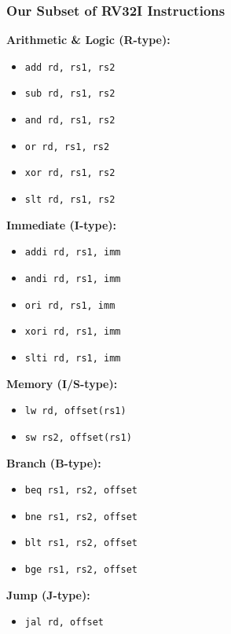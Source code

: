 \documentclass[aspectratio=169,xcolor=dvipsnames]{beamer}
\begin{document}
\begin{frame}
\frametitle{Our Subset of RV32I Instructions}
\begin{multicols}{2}
\textbf{Arithmetic \& Logic (R-type):}
\begin{itemize}
    \item \texttt{add rd, rs1, rs2}
    \item \texttt{sub rd, rs1, rs2}
    \item \texttt{and rd, rs1, rs2}
    \item \texttt{or rd, rs1, rs2}
    \item \texttt{xor rd, rs1, rs2}
    \item \texttt{slt rd, rs1, rs2}
\end{itemize}

\textbf{Immediate (I-type):}
\begin{itemize}
    \item \texttt{addi rd, rs1, imm}
    \item \texttt{andi rd, rs1, imm}
    \item \texttt{ori rd, rs1, imm}
    \item \texttt{xori rd, rs1, imm}
    \item \texttt{slti rd, rs1, imm}
\end{itemize}

\columnbreak

\textbf{Memory (I/S-type):}
\begin{itemize}
    \item \texttt{lw rd, offset(rs1)}
    \item \texttt{sw rs2, offset(rs1)}
\end{itemize}

\textbf{Branch (B-type):}
\begin{itemize}
    \item \texttt{beq rs1, rs2, offset}
    \item \texttt{bne rs1, rs2, offset}
    \item \texttt{blt rs1, rs2, offset}
    \item \texttt{bge rs1, rs2, offset}
\end{itemize}

\textbf{Jump (J-type):}
\begin{itemize}
    \item \texttt{jal rd, offset}
\end{itemize}
\end{multicols}
\end{frame}
\end{document}

